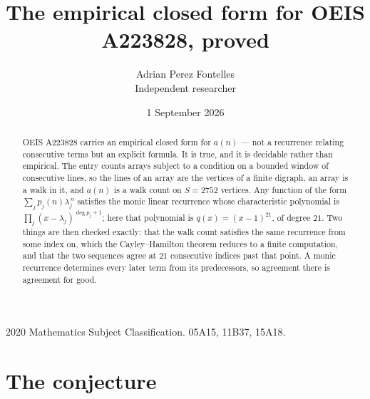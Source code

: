 \documentclass[11pt,a4paper]{article}
\title{The empirical closed form for OEIS A223828, proved}
\author{Adrian Perez Fontelles\\ \small Independent researcher}
\date{1 September 2026}
\theoremstyle{plain}
\theoremstyle{definition}
\begin{document}
\maketitle

\begin{abstract}
OEIS A223828 carries an empirical closed form for $a(n)$ --- not a recurrence relating
consecutive terms but an explicit formula. It is true, and it is decidable rather than
empirical. The entry counts arrays subject to a condition on a bounded window of consecutive lines, so the lines of an array are the
vertices of a finite digraph, an array is a walk in it, and $a(n)$ is a walk count on
$S=2752$ vertices. Any function of the form $\sum_j p_j(n)\lambda_j^{\,n}$ satisfies the
monic linear recurrence whose characteristic polynomial is
$\prod_j(x-\lambda_j)^{\deg p_j+1}$; here that polynomial is $q(x)=(x-1)^{21}$, of degree
$21$. Two things are then checked exactly: that the walk count satisfies the same
recurrence from some index on, which the Cayley--Hamilton theorem reduces to a finite
computation, and that the two sequences agree at $21$ consecutive indices past that
point. A monic recurrence determines every later term from its predecessors, so agreement
there is agreement for good.
\end{abstract}

\noindent\small 2020 Mathematics Subject Classification. 05A15, 11B37, 15A18.\normalsize

\section{The conjecture}
\end{document}
